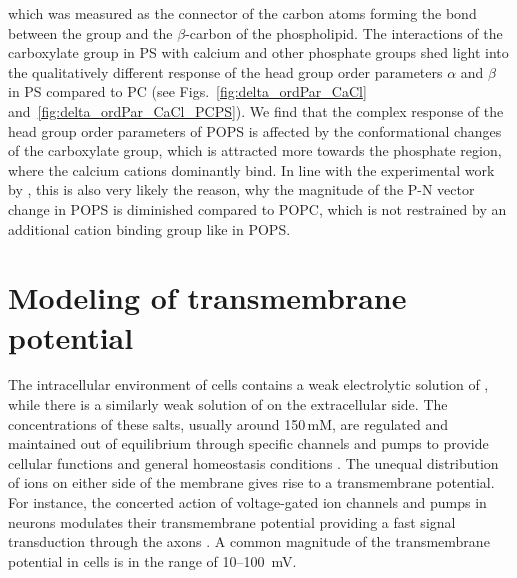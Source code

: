 \documentclass[12pt,a4paper,twoside,openright]{report}
\begin{document}
which was measured as the connector of the carbon atoms 
forming the bond between the group and the $\beta$-carbon of the phospholipid. 
The interactions of the carboxylate group in PS with calcium and other phosphate groups
shed light into the qualitatively different response of the head group order parameters $\alpha$ and $\beta$ in PS compared to PC 
(see Figs.~\ref{fig:delta_ordPar_CaCl} and~\ref{fig:delta_ordPar_CaCl_PCPS}). 
We find that the complex response of the head group order parameters of POPS 
is affected by the conformational changes of the carboxylate group,
which is attracted more towards the phosphate region, 
where the calcium cations dominantly bind. 
In line with the experimental work by \citet{browning80},
this is also very likely the reason, 
why the magnitude of the P-N vector change in POPS is diminished compared to POPC, 
which is not restrained by an additional cation binding group like  in POPS. 










\section*{Modeling of transmembrane potential}

The intracellular environment of cells contains a weak electrolytic solution of , 
while there is a similarly weak solution of  on the extracellular side. 
The concentrations of these salts, usually around 150\,mM, 
are regulated and maintained out of equilibrium through specific channels and pumps 
to provide cellular functions and general homeostasis conditions \citep{Bezanilla2008, Knudsen_book2002}. 
The unequal distribution of ions on either side of the membrane
gives rise to a transmembrane potential. 
For instance, the concerted action of voltage-gated ion channels and pumps in neurons 
modulates their transmembrane potential
providing a fast signal transduction through the axons \citep{Knudsen_book2002, Storace2015, Sung2015}. 
A common magnitude of the transmembrane potential in cells is in the range of 10--100~mV. 
\end{document}
